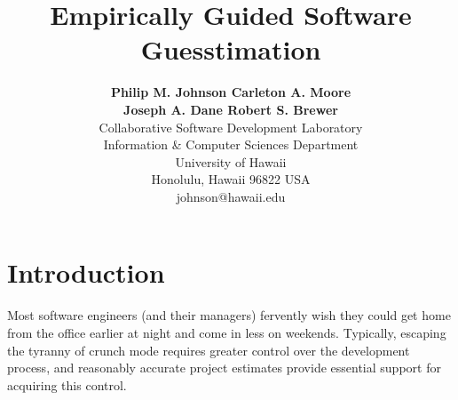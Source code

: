 




\title{Empirically Guided Software Guesstimation}

\author{
        {\bf Philip M. Johnson \hfill Carleton A. Moore}\\ 
        {\bf Joseph A. Dane \hfill  Robert S. Brewer }\\ 
        Collaborative Software Development Laboratory\\
        Information \& Computer Sciences Department\\
        University of Hawaii\\
        Honolulu, Hawaii 96822 USA \\
        johnson@hawaii.edu
        }
\maketitle
%
%
{}

\pagestyle{plain}

\section{Introduction}

Most software engineers (and their managers) fervently wish they could get
home from the office earlier at night and come in less on weekends. Typically,
escaping the tyranny of crunch mode requires greater
control over the development process, and reasonably accurate project
estimates provide essential support for acquiring this control.

